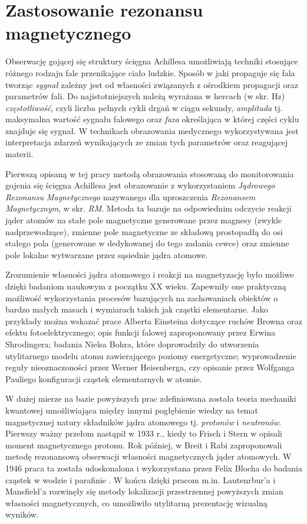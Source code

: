 \section{Zastosowanie rezonansu magnetycznego}
\label{RM}
Obserwację gojącej się struktury ścięgna Achillesa umożliwiają techniki stosujące różnego rodzaju fale przenikające ciało ludzkie. Sposób w jaki propaguje się fala tworząc \textit{sygnał} zależny jest od własności związanych z ośrodkiem propagacji oraz parametrów fali. Do najistotniejszych należą wyrażana w hercach (w skr. Hz) \textit{częstotliwość}, czyli liczba pełnych cykli drgań w ciągu sekundy, \textit{amplituda} tj. maksymalna wartość sygnału falowego oraz \textit{faza} określająca w której części cyklu znajduje się sygnał. W technikach obrazowania medycznego wykorzystywana jest interpretacja zdarzeń wynikających ze zmian tych parametrów oraz reagującej materii.

Pierwszą opisaną w tej pracy metodą obrazowania stosowaną do monitorowania gojenia się ścięgna Achillesa jest obrazowanie z wykorzystaniem \textit{Jądrowego Rezonansu Magnetycznego} nazywanego dla uproszczenia \textit{Rezonansem Magnetycznym}, w skr. \textit{RM}. Metoda ta bazuje na odpowiednim odczycie reakcji jąder atomów na stałe pole magnetyczne generowane przez magnesy (zwykle nadprzewodzące), zmienne pole magnetyczne ze składową prostopadłą do osi stałego pola (generowane w dedykowanej do tego zadania cewce) oraz zmienne pole lokalne wytwarzane przez sąsiednie jądra atomowe.

Zrozumienie własności jądra atomowego i reakcji na magnetyzację było możliwe dzięki badaniom naukowym z początku XX wieku. Zapewniły one praktyczną możliwość wykorzystania procesów bazujących na zachowaniach obiektów o bardzo małych masach i wymiarach takich jak cząstki elementarne. Jako przykłady można wskazać prace Alberta Einsteina dotyczące ruchów Browna oraz efektu fotoelektrycznego; opis funkcji falowej zaproponowany przez Erwina Shrodingera; badania Nielsa Bohra, które doprowadziły do utworzenia utylitarnego modelu atomu zawierającego poziomy energetyczne; wyprowadzenie reguły nieoznaczoności przez Werner Heisenberga, czy opisanie przez Wolfganga Pauliego konfiguracji cząstek elementarnych w atomie. 

W dużej mierze na bazie powyższych prac zdefiniowana została teoria mechaniki kwantowej umożliwiająca między innymi pogłębienie wiedzy na temat magnetycznej natury składników jądra atomowego tj. \textit{protonów} i \textit{neutronów}. Pierwszy ważny przełom nastąpił w 1933 r., kiedy to Frisch i Stern w \cite{Frisch1933} opisali moment magnetycznego protonu. Rok później, w \cite{Breit1934} Breit i Rabi zaproponowali metodę rezonansową obserwacji własności magnetycznych jąder atomowych. W 1946 praca ta została udoskonalona i wykorzystana przez Felix Blocha do badania cząstek w wodzie i parafinie \cite{Bloch1946}. W końcu dzięki pracom m.in. Lautenrbur'a \cite{LAUTERBUR1973} i Mansfield'a \cite{Mansfield1977} rozwinęły się metody lokalizacji przestrzennej powyższych zmian własności magnetycznych, co umożliwiło utylitarną prezentację wizualną wyników. 

